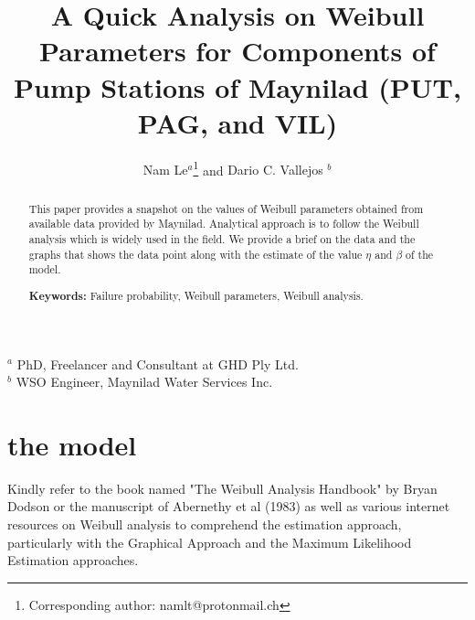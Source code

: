 \documentclass[fleqn]{article}
\begin{document}
	
	\title{\vspace{-5mm}\fontsize{14pt}{10pt}\selectfont\textbf{A Quick Analysis on Weibull Parameters for Components of Pump Stations of Maynilad (PUT, PAG, and VIL)}} %
	\author{
		\large
		\textrm{Nam Le$^{a}$}\thanks{Corresponding author: namlt@protonmail.ch} \hspace{2mm}  and \textrm{Dario C. Vallejos $^{b}$} 
	}
	\date{}
	\maketitle
	
	\textrm{$^{a}$ PhD, Freelancer and Consultant at GHD Ply Ltd.} \\ %
	\textrm{$^{b}$ WSO Engineer, Maynilad Water Services Inc.} \\ %
	
	\thispagestyle{fancy}
	
	\begin{abstract}
		This paper provides a snapshot on the values of Weibull parameters obtained from available data provided by Maynilad. Analytical approach is to follow the Weibull analysis which is widely used in the field. We provide a brief on the data and the graphs that shows the data point along with the estimate of the value $\eta$ and $\beta$ of the model.
		
		
		\bigskip
		
		{\bf Keywords:} Failure probability, Weibull parameters, Weibull analysis.\bigskip
	\end{abstract}
	
	

\section{the model}
Kindly refer to the book named "The Weibull Analysis Handbook" by Bryan Dodson   \cite{Dodson2006} or the manuscript of Abernethy et al (1983) \cite{Abernethy1983} as well as various internet resources on Weibull analysis to comprehend the estimation approach, particularly with the Graphical Approach and the Maximum Likelihood Estimation approaches.
\end{document}
